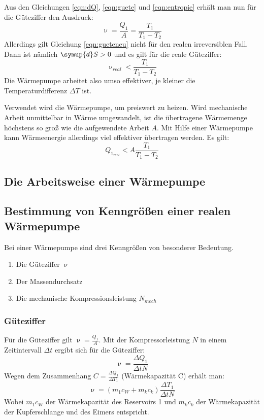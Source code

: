 Aus den Gleichungen \eqref{eqn:dQ}, \eqref{eqn:guete} und \eqref{eqn:entropie} erhält man nun für die Güteziffer den Ausdruck:
\begin{equation}
	\label{eqn:gueteneu}
	\upnu = \frac{Q_1}{A} = \frac{T_1}{T_1 - T_2}
\end{equation}
Allerdings gilt Gleichung \eqref{eqn:gueteneu} nicht für den realen irreversiblen Fall. 
Dann ist nämlich $\symup{d}S > 0$ und es gilt für die reale Güteziffer:
\begin{equation}
	\upnu_{real} < \frac{T_1}{T_1 - T_2}
\end{equation}
Die Wärmepumpe arbeitet also umso effektiver, je kleiner die Temperaturdifferenz $\Delta T$ ist.

Verwendet wird die Wärmepumpe, um preiswert zu heizen.
Wird mechanische Arbeit unmittelbar in Wärme umgewandelt, ist die übertragene Wärmemenge höchstens so groß wie die aufgewendete Arbeit $A$.
Mit Hilfe einer Wärmepumpe kann Wärmeenergie allerdings viel effektiver übertragen werden. Es gilt:
\begin{equation}
	Q_{1_{real}} < A \frac{T_1}{T_1 - T_2}
\end{equation}


\subsection{Die Arbeitsweise einer Wärmepumpe}



\subsection{Bestimmung von Kenngrößen einer realen Wärmepumpe}

Bei einer Wärmepumpe sind drei Kenngrößen von besonderer Bedeutung.
\begin{enumerate}
		\item Die Güteziffer $\upnu$
		\item Der Massendurchsatz
		\item Die mechanische Kompressionsleistung $N_{mech}$
\end{enumerate}



\subsubsection {Güteziffer}
\label{sec:gueteziffer}
Für die Güteziffer gilt $\upnu = \frac{Q_1}{A}$. Mit der Kompressorleistung $N$ in einem Zeitintervall $\Delta t$ ergibt sich für die Güteziffer:
\begin{equation}
	\upnu = \frac{\Delta Q_1}{\Delta t N}
\end{equation}
Wegen dem Zusammenhang $C = \frac{\Delta Q_1}{\Delta T_1}$ (Wärmekapazität C) erhält man:
\begin{equation}
	\label{eqn:gueteziffer}
	\upnu = (m_1 c_W + m_k c_k) \frac{\Delta T_1}{\Delta t N}
\end{equation}
Wobei $m_1 c_W$ der Wärmekapazität des Reservoirs 1 und $m_k c_k$ der Wärmekapazität der Kupferschlange und des Eimers entspricht.

